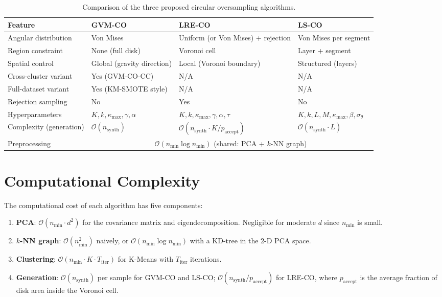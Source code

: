 \begin{table}[H]
\centering
\caption{Comparison of the three proposed circular oversampling algorithms.}
\label{tab:method_comparison}
\small
\begin{tabular}{p{3.5cm}p{3.5cm}p{3.5cm}p{3.5cm}}
\toprule
\textbf{Feature} & \textbf{GVM-CO} & \textbf{LRE-CO} & \textbf{LS-CO} \\
\midrule
Angular distribution & Von Mises & Uniform (or Von Mises) + rejection & Von Mises per segment \\
Region constraint & None (full disk) & Voronoi cell & Layer + segment \\
Spatial control & Global (gravity direction) & Local (Voronoi boundary) & Structured (layers) \\
Cross-cluster variant & Yes (GVM-CO-CC) & N/A & N/A \\
Full-dataset variant & Yes (KM-SMOTE style) & N/A & N/A \\
Rejection sampling & No & Yes & No \\
Hyperparameters & $K, k, \kappa_{\max}, \gamma, \alpha$ & $K, k, \kappa_{\max}, \gamma, \alpha, \tau$ & $K, k, L, M, \kappa_{\max}, \beta, \sigma_\theta$ \\
Complexity (generation) & $\mathcal{O}(n_{\text{synth}})$ & $\mathcal{O}(n_{\text{synth}} \cdot K/p_{\text{accept}})$ & $\mathcal{O}(n_{\text{synth}} \cdot L)$ \\
Preprocessing & \multicolumn{3}{c}{$\mathcal{O}(n_{\min} \log n_{\min})$ (shared: PCA + $k$-NN graph)} \\
\bottomrule
\end{tabular}
\end{table}


\section{Computational Complexity}
\label{sec:methods:complexity}

The computational cost of each algorithm has five components:

\begin{enumerate}[leftmargin=*]
    \item \textbf{PCA}: $\mathcal{O}(n_{\min} \cdot d^2)$ for the covariance matrix and eigendecomposition. Negligible for moderate $d$ since $n_{\min}$ is small.
    \item \textbf{$k$-NN graph}: $\mathcal{O}(n_{\min}^2)$ naively, or $\mathcal{O}(n_{\min} \log n_{\min})$ with a KD-tree in the 2-D PCA space.
    \item \textbf{Clustering}: $\mathcal{O}(n_{\min} \cdot K \cdot T_{\text{iter}})$ for K-Means with $T_{\text{iter}}$ iterations.
    \item \textbf{Generation}: $\mathcal{O}(n_{\text{synth}})$ per sample for GVM-CO and LS-CO; $\mathcal{O}(n_{\text{synth}} / p_{\text{accept}})$ for LRE-CO, where $p_{\text{accept}}$ is the average fraction of disk area inside the Voronoi cell.
\end{enumerate}

